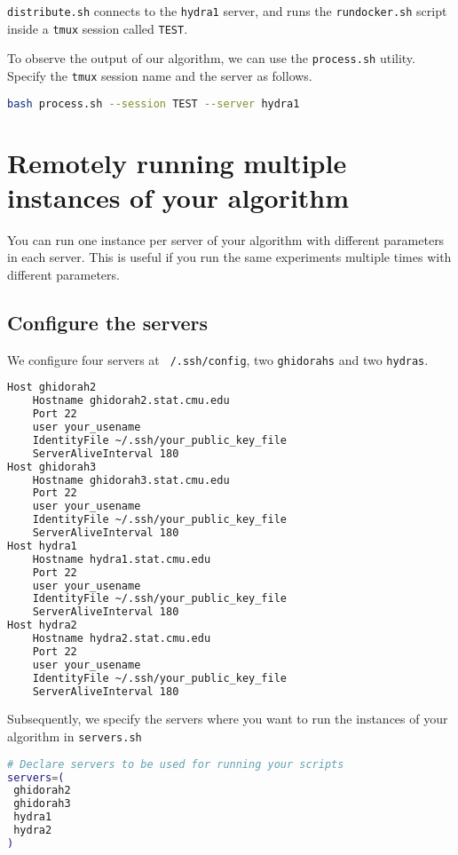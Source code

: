 \documentclass[12pt, letterpaper, onecolumn]{article}
\begin{document}
\texttt{distribute.sh} connects to the \texttt{hydra1} server, and runs the \texttt{rundocker.sh} script inside a \texttt{tmux} session called \texttt{TEST}. 

To observe the output of our algorithm, we can use the \texttt{process.sh} utility. Specify the \texttt{tmux} session name and the server as follows. 

\begin{lstlisting}[language=Bash]
bash process.sh --session TEST --server hydra1
\end{lstlisting}   

\pagebreak

\section{Remotely running multiple instances of your algorithm}

You can run one instance per server of your algorithm with different parameters in each server. This is useful if you run the same experiments multiple times with different parameters.

\subsection{Configure the servers}

We configure four servers at \texttt{~/.ssh/config}, two \texttt{ghidorahs} and two \texttt{hydras}.

\begin{lstlisting}[language=Bash]
Host ghidorah2
	Hostname ghidorah2.stat.cmu.edu
	Port 22
	user your_usename
	IdentityFile ~/.ssh/your_public_key_file
	ServerAliveInterval 180
Host ghidorah3
	Hostname ghidorah3.stat.cmu.edu
	Port 22
	user your_usename
	IdentityFile ~/.ssh/your_public_key_file
	ServerAliveInterval 180
Host hydra1
	Hostname hydra1.stat.cmu.edu
	Port 22
	user your_usename
	IdentityFile ~/.ssh/your_public_key_file
	ServerAliveInterval 180
Host hydra2
	Hostname hydra2.stat.cmu.edu
	Port 22
	user your_usename
	IdentityFile ~/.ssh/your_public_key_file
	ServerAliveInterval 180
\end{lstlisting}  

Subsequently, we specify the servers where you want to run the instances of your algorithm in \texttt{servers.sh} \begin{lstlisting}[language=Bash]
# Declare servers to be used for running your scripts
servers=(
 ghidorah2
 ghidorah3
 hydra1
 hydra2
)
\end{lstlisting}  	
\end{document}
